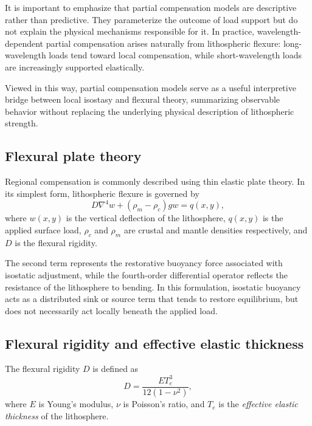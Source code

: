 It is important to emphasize that partial compensation models are descriptive rather than predictive. They parameterize the outcome of load support but do not explain the physical mechanisms responsible for it. In practice, wavelength-dependent partial compensation arises naturally from lithospheric flexure: long-wavelength loads tend toward local compensation, while short-wavelength loads are increasingly supported elastically.

Viewed in this way, partial compensation models serve as a useful interpretive bridge between local isostasy and flexural theory, summarizing observable behavior without replacing the underlying physical description of lithospheric strength.

\subsection{Flexural plate theory}

Regional compensation is commonly described using thin elastic plate theory. In its simplest form, lithospheric flexure is governed by
\begin{equation}
D \nabla^4 w + (\rho_m - \rho_c) g w = q(x,y),
\end{equation}
where \( w(x,y) \) is the vertical deflection of the lithosphere, \( q(x,y) \) is the applied surface load, \( \rho_c \) and \( \rho_m \) are crustal and mantle densities respectively, and \( D \) is the flexural rigidity.

The second term represents the restorative buoyancy force associated with isostatic adjustment, while the fourth-order differential operator reflects the resistance of the lithosphere to bending. In this formulation, isostatic buoyancy acts as a distributed sink or source term that tends to restore equilibrium, but does not necessarily act locally beneath the applied load.

\subsection{Flexural rigidity and effective elastic thickness}

The flexural rigidity \( D \) is defined as
\begin{equation}
D = \frac{E T_e^3}{12(1-\nu^2)},
\end{equation}
where \( E \) is Young's modulus, \( \nu \) is Poisson's ratio, and \( T_e \) is the \emph{effective elastic thickness} of the lithosphere.

